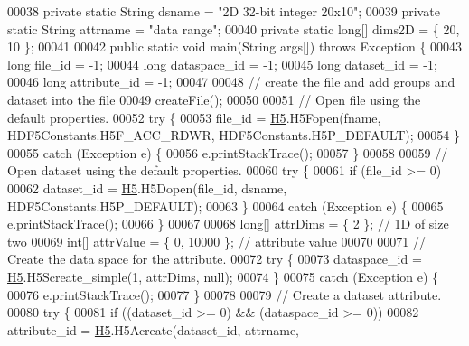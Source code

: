 \begin{DoxyCode}
00038     \textcolor{keyword}{private} \textcolor{keyword}{static} String dsname  = \textcolor{stringliteral}{"2D 32-bit integer 20x10"};
00039     \textcolor{keyword}{private} \textcolor{keyword}{static} String attrname  = \textcolor{stringliteral}{"data range"};
00040     \textcolor{keyword}{private} \textcolor{keyword}{static} \textcolor{keywordtype}{long}[] dims2D = \{ 20, 10 \};
00041 
00042     \textcolor{keyword}{public} \textcolor{keyword}{static} \textcolor{keywordtype}{void} main(String args[]) \textcolor{keywordflow}{throws} Exception \{
00043         \textcolor{keywordtype}{long} file\_id = -1;
00044         \textcolor{keywordtype}{long} dataspace\_id = -1;
00045         \textcolor{keywordtype}{long} dataset\_id = -1;
00046         \textcolor{keywordtype}{long} attribute\_id = -1;
00047 
00048         \textcolor{comment}{// create the file and add groups and dataset into the file}
00049         createFile();
00050 
00051         \textcolor{comment}{// Open file using the default properties.}
00052         \textcolor{keywordflow}{try} \{
00053             file\_id = \hyperlink{namespace_h5}{H5}.H5Fopen(fname, HDF5Constants.H5F\_ACC\_RDWR, HDF5Constants.H5P\_DEFAULT);
00054         \}
00055         \textcolor{keywordflow}{catch} (Exception e) \{
00056             e.printStackTrace();
00057         \}
00058 
00059         \textcolor{comment}{// Open dataset using the default properties.}
00060         \textcolor{keywordflow}{try} \{
00061             \textcolor{keywordflow}{if} (file\_id >= 0)
00062                 dataset\_id = \hyperlink{namespace_h5}{H5}.H5Dopen(file\_id, dsname, HDF5Constants.H5P\_DEFAULT);
00063         \}
00064         \textcolor{keywordflow}{catch} (Exception e) \{
00065             e.printStackTrace();
00066         \}
00067 
00068         \textcolor{keywordtype}{long}[] attrDims = \{ 2 \}; \textcolor{comment}{// 1D of size two}
00069         \textcolor{keywordtype}{int}[] attrValue = \{ 0, 10000 \}; \textcolor{comment}{// attribute value}
00070 
00071         \textcolor{comment}{// Create the data space for the attribute.}
00072         \textcolor{keywordflow}{try} \{
00073             dataspace\_id = \hyperlink{namespace_h5}{H5}.H5Screate\_simple(1, attrDims, null);
00074         \}
00075         \textcolor{keywordflow}{catch} (Exception e) \{
00076             e.printStackTrace();
00077         \}
00078 
00079         \textcolor{comment}{// Create a dataset attribute.}
00080         \textcolor{keywordflow}{try} \{
00081             \textcolor{keywordflow}{if} ((dataset\_id >= 0) && (dataspace\_id >= 0))
00082                 attribute\_id = \hyperlink{namespace_h5}{H5}.H5Acreate(dataset\_id, attrname,

\end{DoxyCode}

